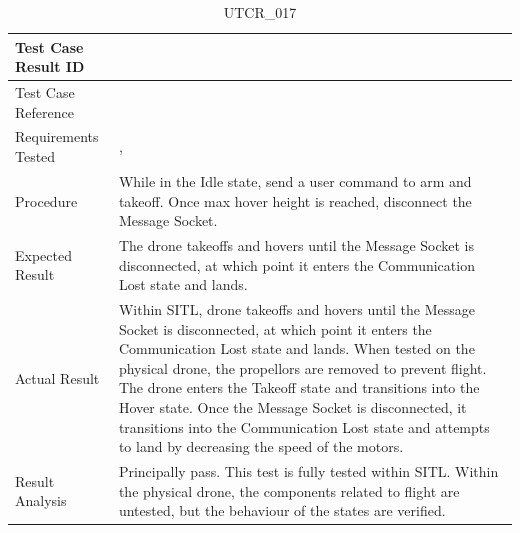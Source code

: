 \documentclass[12pt, titlepage]{article}
\begin{document}
\begin{table}[!h]
\begin{center}
\caption {UTCR\_017}
\label{tab:UTCR_017}
\begin{tabular}{ | m{3.2cm} | m{12.2cm} | } 
\hline
Test Case Result ID & \nameref{tab:UTCR_017} \\ 
\hline
Test Case Reference & \nameref{tab:UTC_017}  \\ 
\hline
Requirements Tested & \nameref{STA_010}, \nameref{TRANS_010} \\ 
\hline
Procedure & While in the Idle state, send a user command to arm and takeoff. Once max hover height is reached, disconnect the Message Socket. \\ 
\hline
Expected Result & The drone takeoffs and hovers until the Message Socket is disconnected, at which point it enters the Communication Lost state and lands. \\
\hline
Actual Result & Within SITL, drone takeoffs and hovers until the Message Socket is disconnected, at which point it enters the Communication Lost state and lands. When tested on the physical drone, the propellors are removed to prevent flight. The drone enters the Takeoff state and transitions into the Hover state. Once the Message Socket is disconnected, it transitions into the Communication Lost state and attempts to land by decreasing the speed of the motors. \\
\hline
Result Analysis & Principally pass. This test is fully tested within SITL. Within the physical drone, the components related to flight are untested, but the behaviour of the states are verified. \\ 
\hline
\end{tabular}
\end{center}
\end{table}
\end{document}
